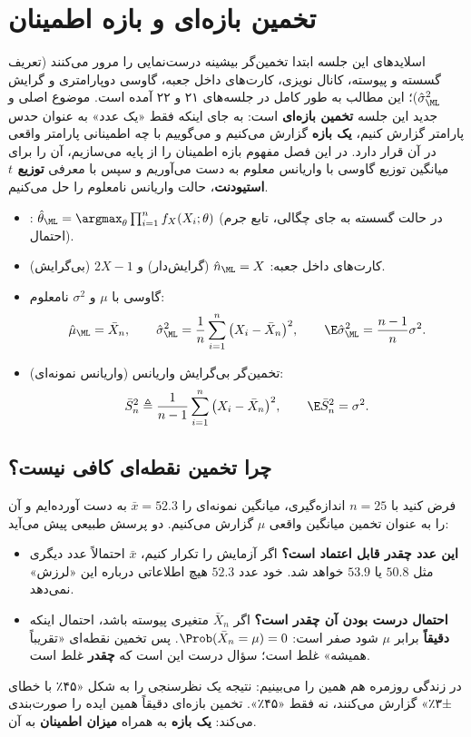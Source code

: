 \chapter{تخمین بازه‌ای و بازه اطمینان}

اسلایدهای این جلسه ابتدا تخمین‌گر بیشینه درست‌نمایی را مرور می‌کنند (تعریف گسسته و پیوسته، کانال نویزی، کارت‌های داخل جعبه، گاوسی دوپارامتری و گرایش $\hat\sigma^2_\ML$)؛ این مطالب به طور کامل در جلسه‌های ۲۱ و ۲۲ آمده است. موضوع اصلی و جدید این جلسه \textbf{تخمین بازه‌ای} است: به جای اینکه فقط «یک عدد» به عنوان حدس پارامتر گزارش کنیم، \textbf{یک بازه} گزارش می‌کنیم و می‌گوییم با چه اطمینانی پارامتر واقعی در آن قرار دارد. در این فصل مفهوم بازه اطمینان را از پایه می‌سازیم، آن را برای میانگین توزیع گاوسی با واریانس معلوم به دست می‌آوریم و سپس با معرفی \textbf{توزیع $t$ استیودنت}، حالت واریانس نامعلوم را حل می‌کنیم.

\begin{summarybox}
\begin{itemize}
\item {}: $\hat\theta_\ML=\argmax_\theta\prod_{i=1}^nf_X(X_i;\theta)$ (در حالت گسسته به جای چگالی، تابع جرم احتمال).
\item کارت‌های داخل جعبه: $\hat n_\ML=X$ (گرایش‌دار) و $2X-1$ (بی‌گرایش).
\item گاوسی با $\mu$ و $\sigma^2$ نامعلوم:
\[
\hat\mu_\ML=\bar X_n,\qquad \hat\sigma^2_\ML=\frac1n\sum_{i=1}^n\big(X_i-\bar X_n\big)^2,\qquad \E\hat\sigma^2_\ML=\frac{n-1}{n}\sigma^2 .
\]
\item تخمین‌گر بی‌گرایش واریانس (واریانس نمونه‌ای):
\[
\bar S_n^2\triangleq\frac{1}{n-1}\sum_{i=1}^n\big(X_i-\bar X_n\big)^2,\qquad \E\bar S^2_n=\sigma^2 .
\]
\end{itemize}
\end{summarybox}

\section{چرا تخمین نقطه‌ای کافی نیست؟}

فرض کنید با $n=25$ اندازه‌گیری، میانگین نمونه‌ای را $\bar x=52.3$ به دست آورده‌ایم و آن را به عنوان تخمین میانگین واقعی $\mu$ گزارش می‌کنیم. دو پرسش طبیعی پیش می‌آید:
\begin{itemize}
\item \textbf{این عدد چقدر قابل اعتماد است؟} اگر آزمایش را تکرار کنیم، $\bar x$ احتمالاً عدد دیگری مثل $50.8$ یا $53.9$ خواهد شد. خود عدد $52.3$ هیچ اطلاعاتی درباره این «لرزش» نمی‌دهد.
\item \textbf{احتمال درست بودن آن چقدر است؟} اگر $\bar X_n$ متغیری پیوسته باشد، احتمال اینکه \textbf{دقیقاً} برابر $\mu$ شود صفر است: $\Prob(\bar X_n=\mu)=0$. پس تخمین نقطه‌ای «تقریباً همیشه» غلط است؛ سؤال درست این است که \textbf{چقدر} غلط است.
\end{itemize}
در زندگی روزمره هم همین را می‌بینیم: نتیجه یک نظرسنجی را به شکل «۴۵٪ با خطای ±۳٪» گزارش می‌کنند، نه فقط «۴۵٪». تخمین بازه‌ای دقیقاً همین ایده را صورت‌بندی می‌کند: \textbf{یک بازه} به همراه \textbf{میزان اطمینان} به آن.

